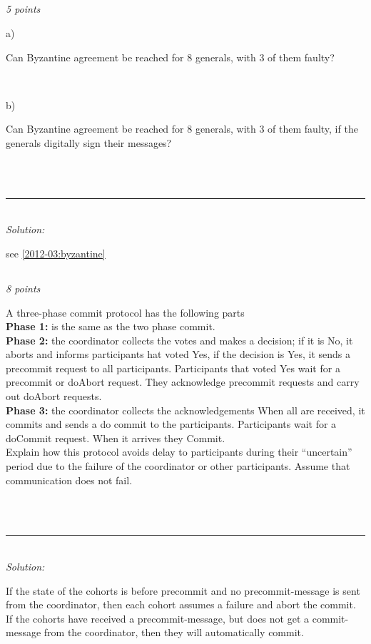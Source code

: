 \documentclass[a4paper]{article}
\newcommand{\horrule}[1]{\rule{\linewidth}{#1}} %
\newcommand{\points}[1]{\subsection{} \textit{#1 points}\\}
\newcommand{\question}[2][]{
  \noindent
  \parbox[t]{\textwidth}{#1 \parbox[t]{0.95\textwidth}{#2}}\\
}
\newcommand{\solution}[1]{\\\horrule{0.5pt}\\[3pt]\textit{Solution: }\\[0.1cm]\begin{minipage}{\textwidth}#1\end{minipage}}
\begin{document}
\points{5}
\question[a)]{
  Can Byzantine agreement be reached for 8 generals, with 3 of them
  faulty?
}
\question[b)]{
  Can Byzantine agreement be reached for 8 generals, with 3 of them
  faulty, if the generals digitally sign their messages?
}
\solution{
  see \ref{2012-03:byzantine}
}

\points{8}
\question{
  A three-phase commit protocol has the following parts \\
  \textbf{Phase 1:} is the same as the two phase commit.\\
  \textbf{Phase 2:} the coordinator collects the votes and makes a
  decision; if it is No, it aborts and informs participants hat voted
  Yes, if the decision is Yes, it sends a precommit request to all
  participants. Participants that voted Yes wait for a precommit or
  doAbort request. They acknowledge precommit requests and carry out
  doAbort requests. \\
  \textbf{Phase 3:} the coordinator collects the acknowledgements When
  all are received, it commits and sends a do commit to the
  participants. Participants wait for a doCommit request. When it
  arrives they Commit. \\
  Explain how this protocol avoids delay to participants during their
  ``uncertain'' period due to the failure of the coordinator or other
  participants. Assume that communication does not fail.
}
\solution{
  If the state of the cohorts is before precommit and no
  precommit-message is sent from the coordinator, then each cohort
  assumes a failure and abort the commit. If the cohorts have received
  a precommit-message, but does not get a commit-message from the
  coordinator, then they will automatically commit.
}
\end{document}
